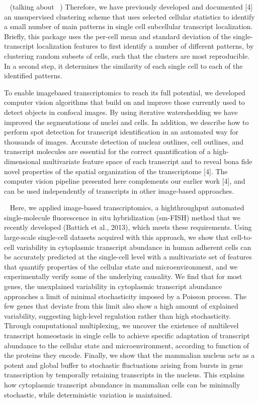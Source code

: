 ~\cite{stoeger_computer_2015}
(talking about ~\cite{battich_image-based_2013})
Therefore, we have previously developed and documented [4] an unsupervised
clustering scheme that uses selected cellular statistics to identify a small
number of main patterns in single cell subcellular transcript localization.
Briefly, this package uses the per-cell mean and standard deviation of the
single-transcript localization features to first identify a number of
different patterns, by clustering random subsets of cells, such that
the clusters are most reproducible. In a second step, it determines the
similarity of each single cell to each of the identified patterns.

To enable imagebased transcriptomics to reach its full potential, we developed
computer vision algorithms that build on and improve those currently used to
detect objects in confocal images. By using iterative watershedding we have
improved the segmentations of nuclei and cells. In addition, we describe how
to perform spot detection for transcript identification in an automated way for
thousands of images. Accurate detection of nuclear outlines, cell outlines, and
transcript molecules are essential for the correct quantification of a
high-dimensional multivariate feature space of each transcript and to reveal
bona fide novel properties of the spatial organization of the transcriptome [4].
The computer vision pipeline presented here complements our earlier work [4],
and can be used independently of transcripts in other image-based approaches.

~\cite{battich_control_2015}
Here, we applied image-based transcriptomics, a highthroughput automated
single-molecule fluorescence in situ hybridization (sm-FISH) method that we
recently developed (Battich et al., 2013), which meets these requirements.
Using large-scale single-cell datasets acquired with this approach, we show
that cell-to-cell variability in cytoplasmic transcript abundance in human
adherent cells can be accurately predicted at the single-cell level with a
multivariate set of features that quantify properties of the cellular state
and microenvironment, and we experimentally verify some of the underlying
causality. We find that for most genes, the unexplained variability in cytoplasmic
transcript abundance approaches a limit of minimal stochasticity imposed by a
Poisson process. The few genes that deviate from this limit also show a high
amount of explained variability, suggesting high-level regulation rather than
high stochasticity. Through computational multiplexing, we uncover the existence
of multilevel transcript homeostasis in single cells to achieve specific
adaptation of transcript abundance to the cellular state and microenvironment,
according to function of the proteins they encode. Finally, we show that the
mammalian nucleus acts as a potent and global buffer to stochastic fluctuations
arising from bursts in gene transcription by temporally retaining transcripts
in the nucleus. This explains how cytoplasmic transcript abundance in mammalian
cells can be minimally stochastic, while deterministic variation is maintained.

